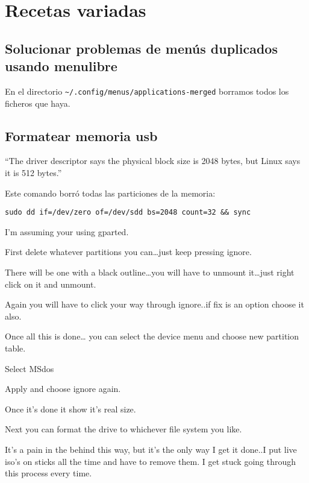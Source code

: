 \documentclass[
  12pt,
  spanish,
]{article}
\begin{document}
\hypertarget{recetas-variadas}{%
\section{Recetas variadas}\label{recetas-variadas}}

\hypertarget{solucionar-problemas-de-menuxfas-duplicados-usando-menulibre}{%
\subsection{Solucionar problemas de menús duplicados usando
menulibre}\label{solucionar-problemas-de-menuxfas-duplicados-usando-menulibre}}

En el directorio
\texttt{\textasciitilde{}/.config/menus/applications-merged} borramos
todos los ficheros que haya.

\hypertarget{formatear-memoria-usb}{%
\subsection{Formatear memoria usb}\label{formatear-memoria-usb}}

``The driver descriptor says the physical block size is 2048 bytes, but
Linux says it is 512 bytes.''

Este comando borró todas las particiones de la memoria:

\texttt{sudo\ dd\ if=/dev/zero\ of=/dev/sdd\ bs=2048\ count=32\ \&\&\ sync}

I'm assuming your using gparted.

First delete whatever partitions you can\ldots just keep pressing
ignore.

There will be one with a black outline\ldots you will have to unmount
it\ldots just right click on it and unmount.

Again you will have to click your way through ignore..if fix is an
option choose it also.

Once all this is done\ldots{} you can select the device menu and choose
new partition table.

Select MSdos

Apply and choose ignore again.

Once it's done it show it's real size.

Next you can format the drive to whichever file system you like.

It's a pain in the behind this way, but it's the only way I get it
done..I put live iso's on sticks all the time and have to remove them. I
get stuck going through this process every time.
\end{document}
